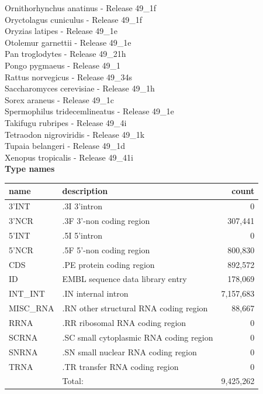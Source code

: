 \documentclass{article}
\begin{document}
\begin{Schunk}
 Ornithorhynchus anatinus - Release 49\_1f \\
 Oryctolagus cuniculus - Release 49\_1f \\
 Oryzias latipes - Release 49\_1e \\
 Otolemur garnettii - Release 49\_1e \\
 Pan troglodytes - Release 49\_21h \\
 Pongo pygmaeus - Release 49\_1 \\
 Rattus norvegicus - Release 49\_34s \\
 Saccharomyces cerevisiae - Release 49\_1h \\
 Sorex araneus - Release 49\_1c \\
 Spermophilus tridecemlineatus - Release 49\_1e \\
 Takifugu rubripes - Release 49\_4i \\
 Tetraodon nigroviridis - Release 49\_1k \\
 Tupaia belangeri - Release 49\_1d \\
 Xenopus tropicalis - Release 49\_41i \\


\textbf{Type names}
\noindent\begin{tabular}{llr}
\hline \hline
name & description & count \\
\hline
3'INT  &  .3I 3'intron  &  0 \\
3'NCR  &  .3F  3'-non coding region  &  307,441 \\
5'INT  &  .5I 5'intron  &  0 \\
5'NCR  &  .5F  5'-non coding region  &  800,830 \\
CDS  &  .PE protein coding region  &  892,572 \\
ID  &  EMBL sequence data library entry  &  178,069 \\
INT\_INT  &  .IN  internal intron  &  7,157,683 \\
MISC\_RNA  &  .RN other structural RNA coding region  &  88,667 \\
RRNA  &  .RR ribosomal RNA coding region  &  0 \\
SCRNA  &  .SC small cytoplasmic RNA coding region  &  0 \\
SNRNA  &  .SN small nuclear RNA coding region  &  0 \\
TRNA  &  .TR transfer RNA coding region  &  0 \\
\hline
 & Total: & 9,425,262 \\
\hline \hline
\end{tabular}


\end{Schunk}
\end{document}

